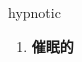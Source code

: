 
\begin{frame}
{\huge hypnotic}
\begin{center}
\begin{enumerate}\Large
  \item \textbf{催眠的}
\end{enumerate}
\end{center}
\end{frame}
